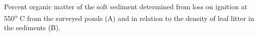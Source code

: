 \label{fig:LOI_survey}
Percent organic matter of the soft sediment determined from loss on ignition at 550\textsuperscript{o} C from the surveyed ponds (A) and in relation to the density of leaf litter in the sediments (B).